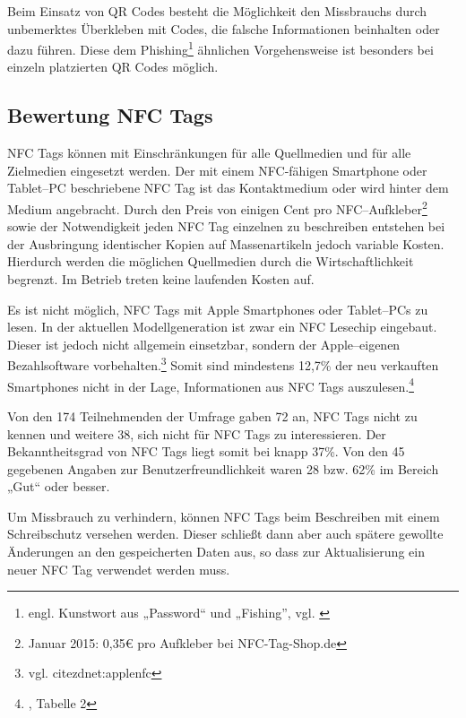 Beim Einsatz von QR Codes besteht die Möglichkeit den Missbrauchs durch unbemerktes Überkleben mit Codes, die falsche Informationen beinhalten oder dazu führen. Diese dem Phishing\footnote{engl. Kunstwort aus „Password“ und „Fishing”, vgl. \cite{bsi:phishing}} ähnlichen Vorgehensweise ist besonders bei einzeln platzierten QR Codes möglich. 


\subsection{Bewertung NFC Tags} %
\label{sub:bewertung_nfc_tags}
NFC Tags können mit Einschränkungen für alle Quellmedien und für alle Zielmedien eingesetzt werden. Der mit einem NFC-fähigen Smartphone oder Tablet–PC beschriebene NFC Tag ist das Kontaktmedium oder wird hinter dem Medium angebracht. Durch den Preis von einigen Cent pro NFC–Aufkleber\footnote{Januar 2015: 0,35€ pro Aufkleber bei NFC-Tag-Shop.de} sowie der Notwendigkeit jeden NFC Tag einzelnen zu beschreiben entstehen bei der Ausbringung identischer Kopien auf Massenartikeln jedoch variable Kosten. Hierdurch werden die möglichen Quellmedien durch die Wirtschaftlichkeit begrenzt. Im Betrieb treten keine laufenden Kosten auf.

Es ist nicht möglich, NFC Tags mit Apple Smartphones oder Tablet–PCs zu lesen. In der aktuellen Modellgeneration ist zwar ein NFC Lesechip eingebaut. Dieser ist jedoch nicht allgemein einsetzbar, sondern der Apple–eigenen Bezahlsoftware vorbehalten.\footnote{vgl. cite{zdnet:applenfc}}
Somit sind mindestens 12,7\% der neu verkauften Smartphones nicht in der Lage, Informationen aus NFC Tags auszulesen.\footnote{\cite{garnter:os}, Tabelle 2}

Von den 174 Teilnehmenden der Umfrage gaben 72 an, NFC Tags nicht zu kennen und weitere 38, sich nicht für NFC Tags zu interessieren. Der Bekanntheitsgrad von NFC Tags liegt somit bei knapp 37\%. Von den 45 gegebenen Angaben zur Benutzerfreundlichkeit waren 28 bzw. 62\% im Bereich „Gut“ oder besser. 

Um Missbrauch zu verhindern, können NFC Tags beim Beschreiben mit einem Schreibschutz versehen werden. Dieser schließt dann aber auch spätere gewollte Änderungen an den gespeicherten Daten aus, so dass zur Aktualisierung ein neuer NFC Tag verwendet werden muss.

